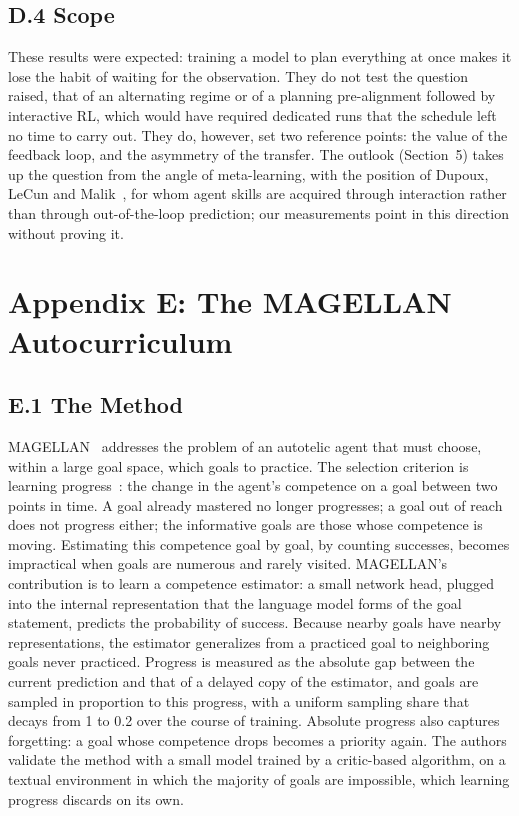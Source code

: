 \documentclass[11pt,a4paper]{article}
\begin{document}
\subsection*{D.4 Scope}
These results were expected: training a model to plan everything at once makes it lose the habit of waiting for the observation. They do not test the question raised, that of an alternating regime or of a planning pre-alignment followed by interactive RL, which would have required dedicated runs that the schedule left no time to carry out. They do, however, set two reference points: the value of the feedback loop, and the asymmetry of the transfer. The outlook (Section~5) takes up the question from the angle of meta-learning, with the position of Dupoux, LeCun and Malik~\cite{dupoux2026why}, for whom agent skills are acquired through interaction rather than through out-of-the-loop prediction; our measurements point in this direction without proving it.

\section{Appendix E: The MAGELLAN Autocurriculum}
\label{annexe:magellan}

\subsection*{E.1 The Method}
MAGELLAN~\cite{gaven2025magellan} addresses the problem of an autotelic agent that must choose, within a large goal space, which goals to practice. The selection criterion is learning progress~\cite{graves2017automated}: the change in the agent's competence on a goal between two points in time. A goal already mastered no longer progresses; a goal out of reach does not progress either; the informative goals are those whose competence is moving. Estimating this competence goal by goal, by counting successes, becomes impractical when goals are numerous and rarely visited. MAGELLAN's contribution is to learn a competence estimator: a small network head, plugged into the internal representation that the language model forms of the goal statement, predicts the probability of success. Because nearby goals have nearby representations, the estimator generalizes from a practiced goal to neighboring goals never practiced. Progress is measured as the absolute gap between the current prediction and that of a delayed copy of the estimator, and goals are sampled in proportion to this progress, with a uniform sampling share that decays from 1 to 0.2 over the course of training. Absolute progress also captures forgetting: a goal whose competence drops becomes a priority again. The authors validate the method with a small model trained by a critic-based algorithm, on a textual environment in which the majority of goals are impossible, which learning progress discards on its own.
\end{document}
